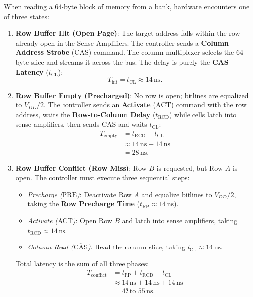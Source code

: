 When reading a 64-byte block of memory from a bank, hardware encounters one of three states:
\begin{enumerate}[itemsep=0pt]
    \item \textbf{Row Buffer Hit (Open Page)}: The target address falls within the row
    already open in the Sense Amplifiers. The controller sends a \textbf{Column Address Strobe}
    ($\overline{\text{CAS}}$) command. The column multiplexer selects the 64-byte slice and
    streams it across the bus. The delay is purely the \textbf{CAS Latency} ($t_{\text{CL}}$):
    \[
        T_{\text{hit}} = t_{\text{CL}} \approx 14\,\text{ns}.
    \]
    \item \textbf{Row Buffer Empty (Precharged)}: No row is open; bitlines are equalized to
    $V_{DD}/2$. The controller sends an \textbf{Activate} ($\text{ACT}$) command with the row
    address, waits the \textbf{Row-to-Column Delay} ($t_{\text{RCD}}$) while cells latch into
    sense amplifiers, then sends $\overline{\text{CAS}}$ and waits $t_{\text{CL}}$:
    \begin{align*}
        T_{\text{empty}} &= t_{\text{RCD}} + t_{\text{CL}} \\
        &\approx 14\,\text{ns} + 14\,\text{ns} \\
        &= 28\,\text{ns}.
    \end{align*}
    \item \textbf{Row Buffer Conflict (Row Miss)}: Row $B$ is requested, but Row $A$ is open.
    The controller must execute three sequential steps:
    \begin{itemize}[itemsep=0pt]
        \item \emph{Precharge ($\text{PRE}$)}: Deactivate Row $A$ and equalize bitlines to $V_{DD}/2$, taking the \textbf{Row Precharge Time} ($t_{\text{RP}} \approx 14\,\text{ns}$).
        \item \emph{Activate ($\text{ACT}$)}: Open Row $B$ and latch into sense amplifiers, taking $t_{\text{RCD}} \approx 14\,\text{ns}$.
        \item \emph{Column Read ($\overline{\text{CAS}}$)}: Read the column slice, taking $t_{\text{CL}} \approx 14\,\text{ns}$.
    \end{itemize}
    Total latency is the sum of all three phases:
    \begin{align*}
        T_{\text{conflict}} &= t_{\text{RP}} + t_{\text{RCD}} + t_{\text{CL}} \\
        &\approx 14\,\text{ns} + 14\,\text{ns} + 14\,\text{ns} \\
        &= 42\,\text{to }55\,\text{ns}.
    \end{align*}
\end{enumerate}

